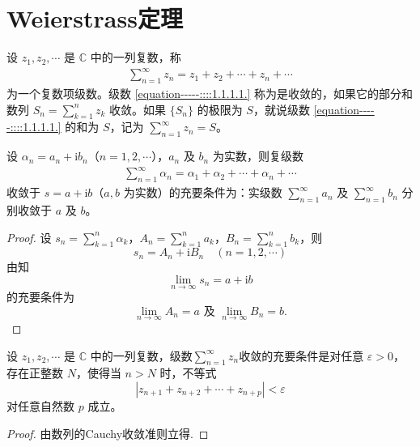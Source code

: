 \documentclass[../../main.tex]{subfiles}
\begin{document}
\section{Weierstrass定理}

\begin{definition}
设 \( z_1, z_2, \cdots \) 是 \( \mathbb{C} \) 中的一列复数，称
\begin{align}
\sum_{n=1}^{\infty} z_n = z_1 + z_2 + \cdots + z_n + \cdots \label{equation-----::::1.1.1.1.}
\end{align}
为一个复数项级数。级数 \eqref{equation-----::::1.1.1.1.} 称为是收敛的，如果它的部分和数列 \( S_n = \sum_{k=1}^{n} z_k \) 收敛。如果 \( \{S_n\} \) 的极限为 \( S \)，就说级数 \eqref{equation-----::::1.1.1.1.} 的和为 \( S \)，记为 \( \sum_{n=1}^{\infty} z_n = S \)。
\end{definition}

\begin{theorem}\label{theorem:复数项级数收敛充要条件}
设 $\alpha_n = a_n + \mathrm{i}b_n$（$n = 1,2,\cdots$），$a_n$ 及 $b_n$ 为实数，则复级数
\begin{align*}
\sum_{n=1}^{\infty}{\alpha _n}=\alpha _1+\alpha _2+\cdots +\alpha _n+\cdots 
\end{align*}
收敛于 $s = a + \mathrm{i}b$（$a,b$ 为实数）的充要条件为：实级数 $\sum_{n = 1}^{\infty} a_n$ 及 $\sum_{n = 1}^{\infty} b_n$ 分别收敛于 $a$ 及 $b$。
\end{theorem}
\begin{proof}
设 $s_n = \sum_{k = 1}^{n} \alpha_k$，$A_n = \sum_{k = 1}^{n} a_k$，$B_n = \sum_{k = 1}^{n} b_k$，则
\[
s_n = A_n + \mathrm{i}B_n \quad (n = 1,2,\cdots)
\]
由知
\[
\lim_{n \to \infty} s_n = a + \mathrm{i}b
\]
的充要条件为
\[
\lim_{n \to \infty} A_n = a \text{ 及 } \lim_{n \to \infty} B_n = b.
\]

\end{proof}

\begin{theorem}[Cauchy收敛准则]
设 \( z_1, z_2, \cdots \) 是 \( \mathbb{C} \) 中的一列复数，级数$\sum_{n=1}^{\infty} z_n$收敛的充要条件是对任意 \( \varepsilon > 0 \)，存在正整数 \( N \)，使得当 \( n > N \) 时，不等式
\[
|z_{n + 1} + z_{n + 2} + \cdots + z_{n + p}| < \varepsilon
\]
对任意自然数 \( p \) 成立。
\end{theorem}
\begin{proof}
由数列的Cauchy收敛准则立得.

\end{proof}
\end{document}
